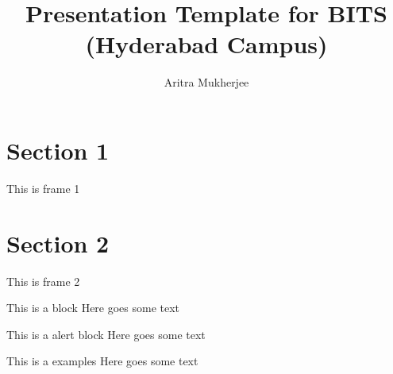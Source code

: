 \documentclass[11pt, aspectratio=169]{beamer}
\author[a.mukherjee]{Aritra Mukherjee}
\title{Presentation Template for BITS\\(Hyderabad Campus)}
\institute{Dept of CSIS, BITS Pilani, Hyderabad Campus}
\begin{document}
\begin{frame}[plain]
\titlepage
\end{frame}

\begin{frame}
\tableofcontents
\end{frame}

\section{Section 1}

\begin{frame}{This is frame 1}
\lipsum[1]



\end{frame}

\section{Section 2}

\begin{frame}{This is frame 2}

\begin{block}{This is a block}
Here goes some text
\end{block}

\begin{alertblock}{This is a alert block}
Here goes some text
\end{alertblock}

\begin{examples}{This is a examples}
Here goes some text
\end{examples}

\end{frame}
\end{document}
